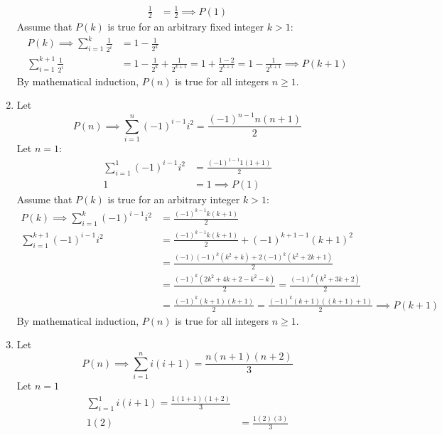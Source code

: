 \documentclass[12pt, A4]{article}
\begin{document}
\begin{enumerate}
\begin{tasks}
\begin{align*}
										\frac{1}{2} &= \frac{1}{2}
												\implies P(1)
									\end{align*}
									Assume that \(P(k)\) is true for an arbitrary fixed integer \(k > 1\):
									\begin{align*}
										P(k) \implies \sum_{i = 1}^k \frac{1}{2^i} &= 1 - \frac{1}{2^k} \\
										\sum_{i = 1}^{k + 1} \frac{1}{2^i} &= 1 - \frac{1}{2^k} + \frac{1}{2^{k + 1}}
												= 1 + \frac{1 - 2}{2^{k + 1}}
												= 1 - \frac{1}{2^{k + 1}}
												\implies P(k + 1)
									\end{align*}
									By mathematical induction, \(P(n)\) is true for all integers \(n \ge 1\).
						\end{tasks}
					\setcounter{enumi}{12}
					\item
						Let
							\[P(n) \implies \sum_{i = 1}^n (-1)^{i - 1}i^2 = \frac{(-1)^{n - 1}n(n + 1)}{2}\]
							Let \(n = 1\):
							\begin{align*}
								\sum_{i = 1}^1 (-1)^{i - 1}i^2 &= \frac{(-1)^{1 - 1}1(1 + 1)}{2} \\
								1 &= 1 \implies P(1)
							\end{align*}
							Assume that \(P(k)\) is true for an arbitrary integer \(k > 1\):
							\begin{align*}
								P(k) \implies \sum_{i = 1}^k (-1)^{i - 1}i^2 &= \frac{(-1)^{k - 1}k(k + 1)}{2} \\
								\sum_{i = 1}^{k + 1} (-1)^{i - 1}i^2 &= \frac{(-1)^{k - 1}k(k + 1)}{2} + (-1)^{k + 1 - 1}(k + 1)^2 \\
									&= \frac{(-1)(-1)^{k}(k^2 + k) + 2(-1)^k(k^2 + 2k + 1)}{2} \\
									&= \frac{(-1)^k(2k^2 + 4k + 2 - k^2 - k)}{2}
											= \frac{(-1)^k(k^2 + 3k + 2)}{2} \\
									&= \frac{(-1)^{k}(k + 1)(k + 1)}{2}
											= \frac{(-1)^k(k + 1)((k + 1) + 1)}{2}
											\implies P(k + 1)
							\end{align*}
							By mathematical induction, \(P(n)\) is true for all integers \(n \ge 1\).
					\setcounter{enumi}{14}
					\item
						Let
							\[P(n) \implies \sum_{i = 1}^n i(i + 1) = \frac{n(n + 1)(n + 2)}{3}\]
							Let \(n = 1\)
							\begin{align*}
								\sum_{i = 1}^1 i(i + 1) = \frac{1(1 + 1)(1 + 2)}{3} \\
								1(2) &= \frac{1(2)(3)}{3} \\

\end{align*}
\end{enumerate}
\end{document}
